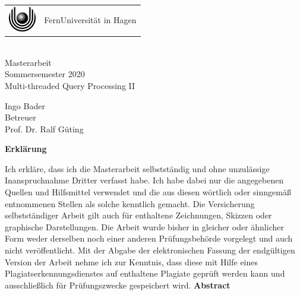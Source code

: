 \documentclass[a4paper,12pt,twoside]{article}
\newcommand{\Theme}{Multi-threaded Query Processing II}
\newcommand{\Name}{Ingo Bader}
\begin{document}
\thispagestyle{empty}
\pagestyle{empty}

\begin{center}
\begin{huge}
\vspace*{3cm}
    \begin{tabular}{m{1.2cm}@{\ \ }m{9cm}}
      \includegraphics[width=1.2cm]{logo.eps} & {FernUniversität in Hagen}
    \end{tabular}
    \\
    \vspace*{3cm}
   Masterarbeit \\
   Sommersemester 2020 \\[2em]
   \glqq{} \Theme \grqq{} \\[2cm]
\end{huge}
\begin{large}
	\Name \\[3cm]
   	Betreuer \\[1em]
   	Prof. Dr. Ralf Güting 
\end{large}
\end{center}

\clearpage
\textbf{Erklärung}

Ich erkläre, dass ich die Masterarbeit selbstständig und ohne unzulässige Inanspruchnahme Dritter verfasst habe. Ich habe dabei nur die angegebenen Quellen und Hilfsmittel verwendet und die aus diesen wörtlich oder sinngemäß entnommenen Stellen als solche kenntlich gemacht. Die Versicherung selbstständiger Arbeit gilt auch für enthaltene Zeichnungen, Skizzen oder graphische Darstellungen. Die Arbeit wurde bisher in gleicher oder ähnlicher Form weder derselben noch einer anderen Prüfungsbehörde vorgelegt und auch nicht veröffentlicht. Mit der Abgabe der elektronischen Fassung der endgültigen Version der Arbeit nehme ich zur Kenntnis, dass diese mit Hilfe eines Plagiatserkennungsdienstes auf enthaltene Plagiate geprüft werden kann und ausschließlich für Prüfungszwecke gespeichert wird.
\clearpage
\textbf{Abstract}
\end{document}
